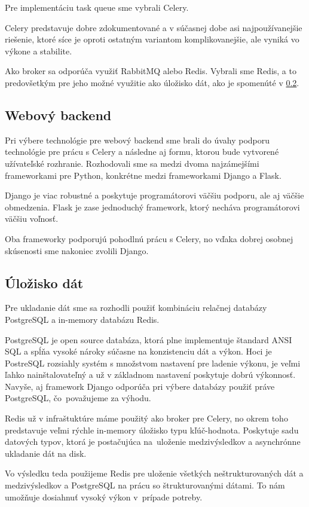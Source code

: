 Pre implementáciu task queue sme vybrali Celery. 
\par Celery predstavuje dobre zdokumentované a v súčasnej dobe asi najpoužívanejšie riešenie, ktoré síce je oproti ostatným variantom komplikovanejšie, ale vyniká vo výkone a stabilite. 
\par Ako broker sa odporúča využiť RabbitMQ alebo Redis. Vybrali sme Redis, a to predovšetkým pre jeho možné využitie ako úložisko dát, ako je spomenúté v \ref{sec:store}.

\subsection{Webový backend}
Pri výbere technológie pre webový backend sme brali do úvahy podporu technológie pre prácu s Celery a následne aj formu, ktorou bude vytvorené užívateľské rozhranie. Rozhodovali sme sa medzi dvoma najzámejšími frameworkami pre Python, konkrétne medzi frameworkami Django a Flask.
\par Django je viac robustné a poskytuje programátorovi väčšiu podporu, ale aj väčšie obmedzenia. Flask je zase jednoduchý framework, ktorý necháva programátorovi väčšiu voľnosť.
\par Oba frameworky podporujú pohodlnú prácu s Celery, no vďaka dobrej osobnej skúsenosti sme nakoniec zvolili Django.

\subsection{Úložisko dát}
\label{sec:store}
Pre ukladanie dát sme sa rozhodli použiť kombináciu relačnej databázy PostgreSQL a in-memory databázu Redis. 
\par PostgreSQL je open source databáza, ktorá plne implementuje štandard ANSI SQL a spĺňa vysoké nároky súčasne na konzistenciu dát a výkon. Hoci je PostreSQL rozsiahly systém s množstvom nastavení pre ladenie výkonu, je veľmi ľahko nainštalovateľný a už v základnom nastavení poskytuje dobrú výkonnosť. Navyše, aj framework Django odporúča pri výbere databázy použiť práve PostgreSQL, čo~považujeme za výhodu.
\par Redis už v infraštuktúre máme použitý ako broker pre Celery, no okrem toho predstavuje veľmi rýchle in-memory úložisko typu kľúč-hodnota. Poskytuje sadu datových typov, ktorá je postačujúca na~uloženie medzivýsledkov a asynchrónne ukladanie dát na disk.
\par Vo výsledku teda použijeme Redis pre uloženie všetkých neštrukturovaných dát a medzivýsledkov a PostgreSQL na prácu so štruktu\-rovanými dátami. To nám umožňuje dosiahnuť vysoký výkon v~prípade potreby.

